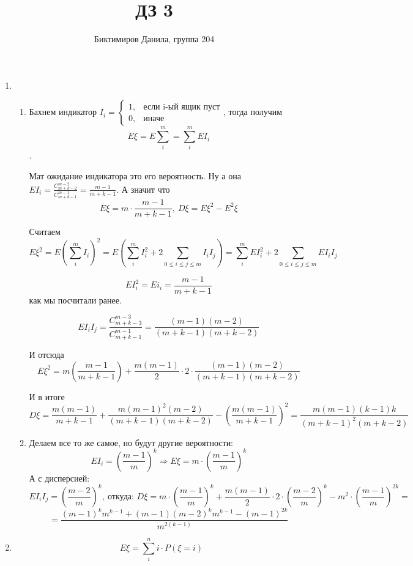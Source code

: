 \documentclass[11pt]{article}
\begin{document}
	
	\author{Биктимиров Данила, группа 204}
	\title{ДЗ 3}
	\date{}
	\maketitle
	
	\medskip
	
	\begin{enumerate}
		
		\item \begin{enumerate}
			\item Бахнем индикатор $I_i=\begin{cases}
				1, &\text{если i-ый ящик пуст}\\
				0, &\text{иначе}
			\end{cases}$, тогда получим $$E\xi=E\sum_{i}^{m}=\sum_{i}^{m}EI_i$$.
			
			Мат ожидание индикатора это его вероятность. Ну а она $EI_i=\frac{C^{m-2}_{m+k-2}}{C^{m-1}_{m+k-1}}=\frac{m-1}{m+k-1}$. А значит что $$E\xi=m\cdot \frac{m-1}{m+k-1}, \:D\xi = E\xi^2-E^2\xi$$
			
			Считаем $$E\xi^2=E(\sum_{i}^{m}I_i)^2=E\left(\sum_{i}^{m}I^2_i + 2\sum_{0\le i\le j\le m}I_iI_j \right)=\sum_{i}^{m}EI^2_i+2\sum_{0\le i\le j\le m}EI_iI_j$$
			
			$$EI^2_i=Ei_i=\frac{m-1}{m+k-1}$$ как мы посчитали ранее.
			
			$$EI_iI_j=\frac{C^{m-3}_{m+k-3}}{C^{m-1}_{m+k-1}}=\frac{(m-1)(m-2)}{(m+k-1)(m+k-2)}$$
			
			И отсюда $$E \xi^2 = m \left(\frac{m - 1}{m + k - 1}\right)+\frac{m(m-1)}{2}\cdot2\cdot\frac{(m-1)(m-2)}{(m+k-1)(m+k-2)}$$
			
			И в итоге $$D\xi = \frac{m(m-1)}{m+k-1}+\frac{m(m-1)^2(m-2)}{(m+k-1)(m+k-2)}-\left(\frac{m(m-1)}{m+k-1}\right)^2 = \frac{m(m-1)(k-1)k}{(m + k- 1)^2(m+k-2)}$$
			
			\item Делаем все то же самое, но будут другие вероятности:
			$$EI_i=\left(\frac{m-1}{m}\right)^k\Rightarrow E\xi =m\cdot\left(\frac{m-1}{m}\right)^k$$
			А с дисперсией:
			$$EI_iI_j=\left(\frac{m-2}{m}\right)^k,\:\text{откуда: } D\xi =m\cdot \left(\frac{m-1}{m}\right)^k + \frac{m(m-1)}{2}\cdot 2\cdot \left(\frac{m-2}{m}\right)^k - m^2\cdot \left(\frac{m-1}{m}\right)^{2k}=$$
			$$=\frac{(m-1)^k m^{k-1} + (m-1)(m-2)^km^{k-1}-(m-1)^{2k}}{m^{2(k-1)}}$$
		\end{enumerate}
		\item $$E\xi = \sum_{i}^{n}i\cdot P(\xi = i)$$
	\end{enumerate}
\end{document}

